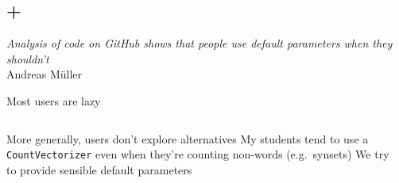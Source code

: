 \documentclass[aspectratio=169, 22pt]{beamer}
\newenvironment{sectionslide}
			{\subsection*{+}\begin{frame}[fragile,environment=sectionslide]\vfill\begin{center}\Large}
			{\end{center}\vfill\end{frame}}
\begin{document}
\begin{sectionslide}
	\emph{Analysis of code on GitHub shows that people use default parameters when they shouldn't} \\
	\raggedleft Andreas M\"uller
\end{sectionslide}

\begin{plain}{Most users are lazy}
	\begin{columns}\begin{column}{.65\textwidth}
		\vspace{-2em}
	\begin{itemize}
	\p More generally, users don't explore alternatives
	\p My students tend to use a \verb|CountVectorizer| even when they're counting non-words (e.g.\ synsets)
	\p We try to provide sensible default parameters
	\vfill
	\end{itemize}
\end{column}
\begin{column}{.39\textwidth}
	\vspace*{-36pt}
\end{column}
\end{columns}
\end{plain}
\end{document}
